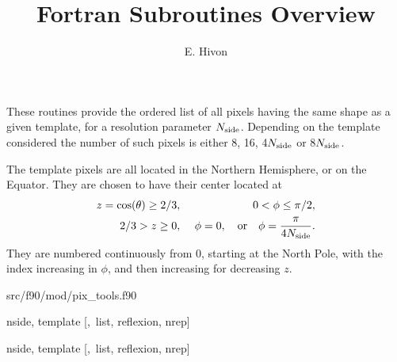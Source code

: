 
\sloppy


\title{\healpix Fortran Subroutines Overview}
 \section[same\_shape\_pixels\_nest, same\_shape\_pixels\_ring]{ }
\label{sub:same_shape_pixels_xxx}
\author{E. Hivon}

\begin{facility}
{These routines provide the ordered list of all \healpix pixels having the same shape
  as a given template, for a resolution parameter ${N_{\rm side}}$. Depending on the
  template considered the number of such pixels is either 8, 16, 4${N_{\rm side}}$ or
  8${N_{\rm side}}$.


The template pixels are all located in the Northern Hemisphere, or on the
 Equator.
They are chosen to have their center located at
\begin{eqnarray}
     z=\cos(\theta)\ge 2/3,  &\ &    0< \phi \leq \pi/2,   \nonumber\\            %
     2/3 > z \geq 0,  &\ & \phi=0, \quad{\rm or}\quad  \phi=\frac{\pi}{4\nside}.  \nonumber %
\myhtmlimage{}
\end{eqnarray}
 They are numbered continuously from 0, starting at the North Pole, with the index
 increasing in $\phi$, and then increasing for decreasing $z$.
}
{src/f90/mod/pix\_tools.f90}
\end{facility}

\begin{f90format}
{ nside, template [,~list, reflexion, nrep]}
\end{f90format}
\begin{f90format}
{ nside, template [,~list, reflexion, nrep]}
\end{f90format}

